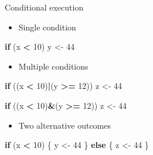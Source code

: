 \documentclass[ignorenonframetext,]{beamer}
\newenvironment{Shaded}{\begin{snugshade}}{\end{snugshade}}
\newcommand{\DecValTok}[1]{\textcolor[rgb]{0.00,0.00,0.81}{#1}}
\newcommand{\StringTok}[1]{\textcolor[rgb]{0.31,0.60,0.02}{#1}}
\newcommand{\ControlFlowTok}[1]{\textcolor[rgb]{0.13,0.29,0.53}{\textbf{#1}}}
\newcommand{\OperatorTok}[1]{\textcolor[rgb]{0.81,0.36,0.00}{\textbf{#1}}}
\newcommand{\NormalTok}[1]{#1}
\providecommand{\tightlist}{%
  \setlength{\itemsep}{0pt}\setlength{\parskip}{0pt}}
\begin{document}
\begin{frame}[fragile]{Conditional execution}

\begin{itemize}[<+->]
\tightlist
\item
  Single condition
\end{itemize}

\begin{Shaded}
\begin{Highlighting}[]
\ControlFlowTok{if}\NormalTok{ (x }\OperatorTok{<}\StringTok{ }\DecValTok{10}\NormalTok{) y <-}\StringTok{ }\DecValTok{44}
\end{Highlighting}
\end{Shaded}

\end{frame}

\begin{frame}[fragile]

\begin{itemize}[<+->]
\tightlist
\item
  Multiple conditions
\end{itemize}

\begin{Shaded}
\begin{Highlighting}[]
\ControlFlowTok{if}\NormalTok{ ((x }\OperatorTok{<}\StringTok{ }\DecValTok{10}\NormalTok{)}\OperatorTok{|}\NormalTok{(y }\OperatorTok{>=}\StringTok{ }\DecValTok{12}\NormalTok{)) z <-}\StringTok{ }\DecValTok{44}
\end{Highlighting}
\end{Shaded}

\begin{Shaded}
\begin{Highlighting}[]
\ControlFlowTok{if}\NormalTok{ ((x }\OperatorTok{<}\StringTok{ }\DecValTok{10}\NormalTok{)}\OperatorTok{&}\NormalTok{(y }\OperatorTok{>=}\StringTok{ }\DecValTok{12}\NormalTok{)) z <-}\StringTok{ }\DecValTok{44}
\end{Highlighting}
\end{Shaded}

\end{frame}

\begin{frame}[fragile]

\begin{itemize}[<+->]
\tightlist
\item
  Two alternative outcomes
\end{itemize}

\begin{Shaded}
\begin{Highlighting}[]
\ControlFlowTok{if}\NormalTok{ (x }\OperatorTok{<}\StringTok{ }\DecValTok{10}\NormalTok{) \{}
\NormalTok{  y <-}\StringTok{ }\DecValTok{44}
\NormalTok{\} }\ControlFlowTok{else}\NormalTok{ \{}
\NormalTok{  z <-}\StringTok{ }\DecValTok{44}
\NormalTok{\}}
\end{Highlighting}
\end{Shaded}

\end{frame}
\end{document}
